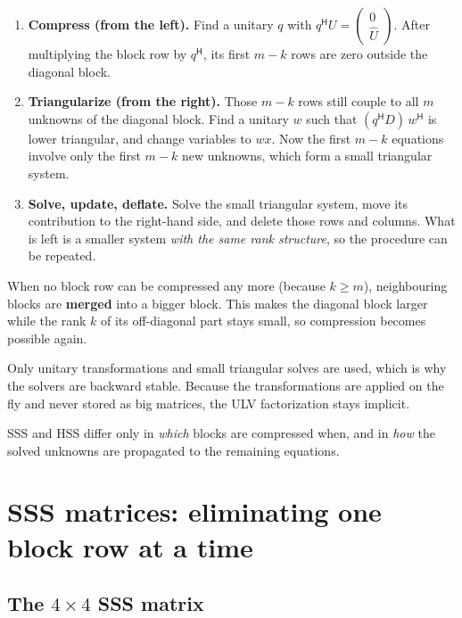 \documentclass[11pt]{article}
\newcommand{\ct}{^{\mathsf H}}            %
\newcommand{\hU}{\widehat U}
\theoremstyle{definition}
\begin{document}
\begin{enumerate}
  \item \textbf{Compress (from the left).} Find a unitary $q$ with
    $q\ct U = \left(\begin{smallmatrix}0\\ \hU\end{smallmatrix}\right)$. After multiplying
    the block row by $q\ct$, its first $m-k$ rows are zero outside the diagonal block.
  \item \textbf{Triangularize (from the right).} Those $m-k$ rows still couple to all
    $m$ unknowns of the diagonal block. Find a unitary $w$ such that
    $(q\ct D)\,w\ct$ is lower triangular, and change variables to $w x$. Now the
    first $m-k$ equations involve only the first $m-k$ new unknowns, which form
    a small triangular system.
  \item \textbf{Solve, update, deflate.} Solve the small triangular system,
    move its contribution to the right-hand side, and delete those rows and columns.
    What is left is a smaller system \emph{with the same rank structure}, so the
    procedure can be repeated.
\end{enumerate}

When no block row can be compressed any more (because $k\geq m$), neighbouring
blocks are \textbf{merged} into a bigger block. This makes the diagonal block larger
while the rank $k$ of its off-diagonal part stays small, so compression becomes
possible again.

Only unitary transformations and small triangular solves are used, which is
why the solvers are backward stable. Because the transformations are applied
on the fly and never stored as big matrices, the ULV factorization stays
implicit.

SSS and HSS differ only in \emph{which} blocks are compressed when, and in
\emph{how} the solved unknowns are propagated to the remaining equations.

\section{SSS matrices: eliminating one block row at a time}
\label{sec:sss}

\subsection{\texorpdfstring{The $4\times4$ SSS matrix}{The 4x4 SSS matrix}}
\end{document}
